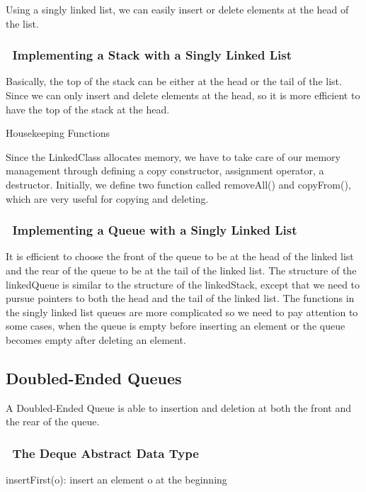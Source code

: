 \documentclass[twocolumn,10pt]{jarticle}
\begin{document}
Using a singly linked list, we can easily insert or delete elements at the head of the list. 
\subsubsection{\ Implementing a Stack with a Singly Linked List}
Basically, the top of the stack can be either at the head or the tail of the list. Since we can only insert and delete elements at the head, so it is more efficient to have the top of the stack at the head.

Housekeeping Functions

Since the LinkedClass allocates memory, we have to take care of our memory management through defining a copy constructor, assignment operator, a destructor. Initially, we define two function called removeAll() and copyFrom(), which are very useful for copying and deleting. 
\subsubsection{\ Implementing a Queue with a Singly Linked List}
It is efficient to choose the front of the queue to be at the head of the linked list and the rear of the queue to be at the tail of the linked list. The structure of the linkedQueue is similar to the structure of the linkedStack, except that we need to pursue pointers to both the head and the tail of the linked list. The functions in the singly linked list queues are more complicated so we need to pay attention to some cases, when the queue is empty before inserting an element or the queue becomes empty after deleting an element.
\setcounter{section}{4}
\setcounter{subsection}{4}
\subsection{ Doubled-Ended Queues}
A Doubled-Ended Queue is able to insertion and deletion at both the front and the rear of the queue.
\subsubsection{\ The Deque Abstract Data Type}
insertFirst(o): insert an element o at the beginning
\end{document}
